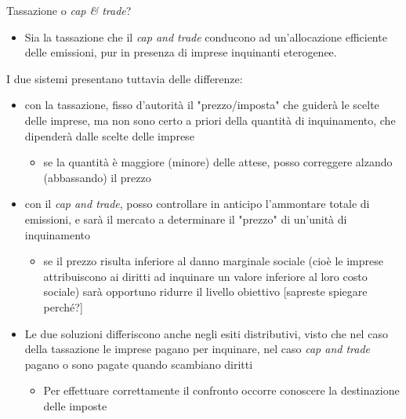 \documentclass[aspectratio=64,11pt]{beamer}
\begin{document}
\begin{frame}{Tassazione o \emph{cap \& trade}?}
\begin{itemize}
\item Sia la tassazione che il \emph{cap and trade} conducono ad un'allocazione
efficiente delle emissioni, pur in presenza di imprese inquinanti
eterogenee.
\end{itemize}
I due sistemi presentano tuttavia delle differenze:
\begin{itemize}
\item \alert{con la tassazione}, fisso d'autorità il "prezzo/imposta" che guiderà le
scelte delle imprese, ma non sono certo a priori della quantità di
inquinamento, che dipenderà dalle scelte delle imprese
\begin{itemize}
\item se la quantità è maggiore (minore) delle attese, posso correggere alzando
(abbassando) il prezzo
\end{itemize}
\item \alert{con il \emph{cap and trade}}, posso controllare in anticipo l'ammontare totale
di emissioni, e sarà il mercato a determinare il "prezzo" di un'unità di
inquinamento
\begin{itemize}
\item se il prezzo risulta inferiore al danno marginale sociale (cioè le imprese
attribuiscono ai diritti ad inquinare un valore inferiore al loro costo
sociale) sarà opportuno ridurre il livello obiettivo [sapreste spiegare
perché?]
\end{itemize}
\item Le due soluzioni differiscono anche negli esiti distributivi, visto che nel
caso della tassazione le imprese pagano per inquinare, nel caso \emph{cap and
trade} pagano o sono pagate quando scambiano diritti
\begin{itemize}
\item Per effettuare correttamente il confronto occorre conoscere la
destinazione delle imposte
\end{itemize}
\end{itemize}
\end{frame}
\end{document}
